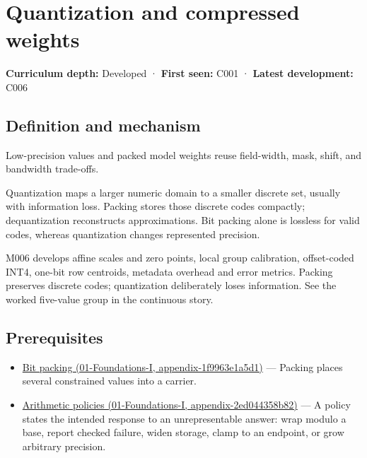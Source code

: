 \hypertarget{appendix-fdc7879e8bf2}{}
\section{Quantization and compressed weights}\label{appendix-fdc7879e8bf2-quantization-and-compressed-weights}

\textbf{Curriculum depth:} Developed · \textbf{First seen:} C001 · \textbf{Latest development:} C006

\subsection{Definition and mechanism}\label{appendix-fdc7879e8bf2-definition-and-mechanism}

Low-precision values and packed model weights reuse field-width, mask, shift, and bandwidth trade-offs.

Quantization maps a larger numeric domain to a smaller discrete set, usually with information loss. Packing stores those discrete codes compactly; dequantization reconstructs approximations. Bit packing alone is lossless for valid codes, whereas quantization changes represented precision.

M006 develops affine scales and zero points, local group calibration, offset-coded INT4, one-bit row centroids, metadata overhead and error metrics. Packing preserves discrete codes; quantization deliberately loses information. See the worked five-value group in the continuous story.

\subsection{Prerequisites}\label{appendix-fdc7879e8bf2-prerequisites}

\begin{itemize}
\tightlist
\item
  \href{../01-Foundations-I/main.pdf\#nameddest=appendix-1f9963e1a5d1}{Bit packing (01-Foundations-I, appendix-1f9963e1a5d1)} --- Packing places several constrained values into a carrier.
\item
  \href{../01-Foundations-I/main.pdf\#nameddest=appendix-2ed044358b82}{Arithmetic policies (01-Foundations-I, appendix-2ed044358b82)} --- A policy states the intended response to an unrepresentable answer: wrap modulo a base, report checked failure, widen storage, clamp to an endpoint, or grow arbitrary precision.
\end{itemize}

